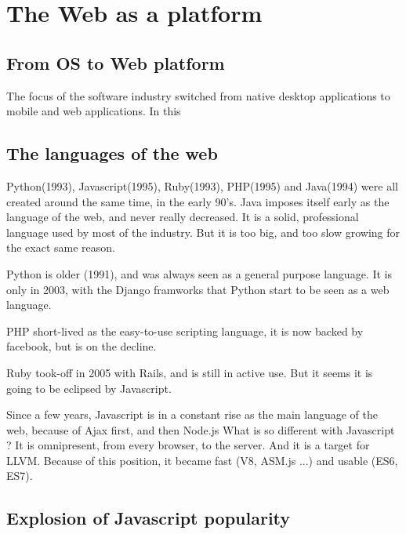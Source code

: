 \section{The Web as a platform}

\subsection{From OS to Web platform}

The focus of the software industry switched from native desktop applications to mobile and web applications.
In this 

\subsection{The languages of the web}

Python(1993), Javascript(1995), Ruby(1993), PHP(1995) and Java(1994) were all created around the same time, in the early 90's.
Java imposes itself early as the language of the web, and never really decreased. It is a solid, professional language used by most of the industry.
But it is too big, and too slow growing for the exact same reason.

Python is older (1991), and was always seen as a general purpose language.
It is only in 2003, with the Django framworks that Python start to be seen as a web language.

PHP short-lived as the easy-to-use scripting language, it is now backed by facebook, but is on the decline.

Ruby took-off in 2005 with Rails, and is still in active use.
But it seems it is going to be eclipsed by Javascript.

Since a few years, Javascript is in a constant rise as the main language of the web, because of Ajax first, and then Node.js
What is so different with Javascript ?
It is omnipresent, from every browser, to the server.
And it is a target for LLVM.
Because of this position, it became fast (V8, ASM.js ...) and usable (ES6, ES7).

\subsection{Explosion of Javascript popularity}

